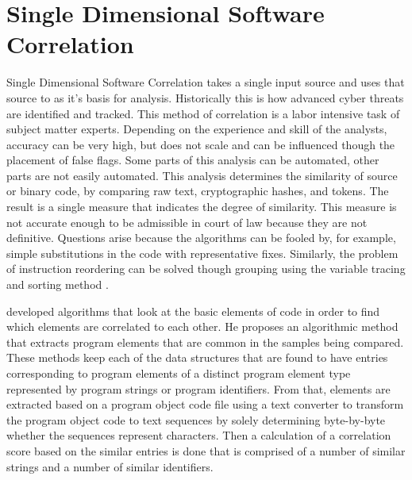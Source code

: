 \documentclass[12pt]{report}
\begin{document}
\section{Single Dimensional Software Correlation}
Single Dimensional Software Correlation takes a single input source and uses that source to as it's basis for analysis.  Historically this is how advanced cyber threats are identified and tracked.  This method of correlation is a labor intensive task of subject matter experts.  Depending on the experience and skill of the analysts, accuracy can be very high, but does not scale and can be influenced though the placement of false flags.  Some parts of this analysis can be automated, other parts are not easily automated.  This analysis determines the similarity of source or binary code, by comparing raw text, cryptographic hashes, and tokens.  The result is a single measure that indicates the degree of similarity.  This measure is not accurate enough to be admissible in court of law because they are not definitive.  Questions arise because the algorithms can be fooled by, for example, simple substitutions in the code with representative fixes.  Similarly, the problem of instruction reordering can be solved though grouping using the variable tracing and sorting method \cite{oh2009fight}.

\cite{zeidman2012detecting} developed algorithms that look at the basic elements of code in order to find which elements are correlated to each other.  He proposes an algorithmic method that extracts program elements that are common in the samples being compared.  These methods keep each of the data structures that are found to have entries corresponding to program elements of a distinct program element type represented by program strings or program identifiers.   From that, elements are extracted based on a program object code file using a text converter to transform the program object code to text sequences by solely determining byte-by-byte whether the sequences represent characters.  Then a calculation of a correlation score based on the similar entries is done that is comprised of a number of similar strings and a number of similar identifiers.

\end{document}
